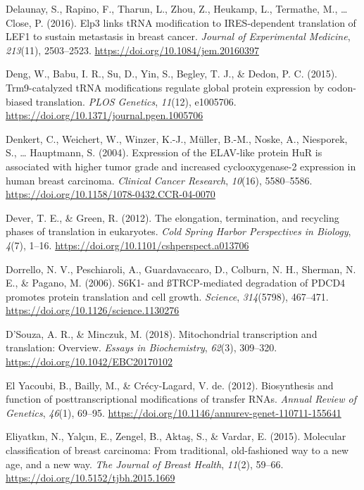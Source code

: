 \documentclass[12pt,openany]{book}
\begin{document}
\hypertarget{ref-Delaunay2016}{}
Delaunay, S., Rapino, F., Tharun, L., Zhou, Z., Heukamp, L., Termathe,
M., \ldots{} Close, P. (2016). Elp3 links tRNA modification to
IRES-dependent translation of LEF1 to sustain metastasis in breast
cancer. \emph{Journal of Experimental Medicine}, \emph{213}(11),
2503--2523. \url{https://doi.org/10.1084/jem.20160397}

\hypertarget{ref-Deng2015}{}
Deng, W., Babu, I. R., Su, D., Yin, S., Begley, T. J., \& Dedon, P. C.
(2015). Trm9-catalyzed tRNA modifications regulate global protein
expression by codon-biased translation. \emph{PLOS Genetics},
\emph{11}(12), e1005706.
\url{https://doi.org/10.1371/journal.pgen.1005706}

\hypertarget{ref-Denkert2004}{}
Denkert, C., Weichert, W., Winzer, K.-J., Müller, B.-M., Noske, A.,
Niesporek, S., \ldots{} Hauptmann, S. (2004). Expression of the
ELAV-like protein HuR is associated with higher tumor grade and
increased cyclooxygenase-2 expression in human breast carcinoma.
\emph{Clinical Cancer Research}, \emph{10}(16), 5580--5586.
\url{https://doi.org/10.1158/1078-0432.CCR-04-0070}

\hypertarget{ref-Dever2012}{}
Dever, T. E., \& Green, R. (2012). The elongation, termination, and
recycling phases of translation in eukaryotes. \emph{Cold Spring Harbor
Perspectives in Biology}, \emph{4}(7), 1--16.
\url{https://doi.org/10.1101/cshperspect.a013706}

\hypertarget{ref-Dorrello2006}{}
Dorrello, N. V., Peschiaroli, A., Guardavaccaro, D., Colburn, N. H.,
Sherman, N. E., \& Pagano, M. (2006). S6K1- and ßTRCP-mediated
degradation of PDCD4 promotes protein translation and cell growth.
\emph{Science}, \emph{314}(5798), 467--471.
\url{https://doi.org/10.1126/science.1130276}

\hypertarget{ref-DSouza2018}{}
D'Souza, A. R., \& Minczuk, M. (2018). Mitochondrial transcription and
translation: Overview. \emph{Essays in Biochemistry}, \emph{62}(3),
309--320. \url{https://doi.org/10.1042/EBC20170102}

\hypertarget{ref-ElYacoubi2012}{}
El Yacoubi, B., Bailly, M., \& Crécy-Lagard, V. de. (2012). Biosynthesis
and function of posttranscriptional modifications of transfer RNAs.
\emph{Annual Review of Genetics}, \emph{46}(1), 69--95.
\url{https://doi.org/10.1146/annurev-genet-110711-155641}

\hypertarget{ref-Eliyatkin2015}{}
Eliyatkın, N., Yalçın, E., Zengel, B., Aktaş, S., \& Vardar, E. (2015).
Molecular classification of breast carcinoma: From traditional,
old-fashioned way to a new age, and a new way. \emph{The Journal of
Breast Health}, \emph{11}(2), 59--66.
\url{https://doi.org/10.5152/tjbh.2015.1669}
\end{document}
